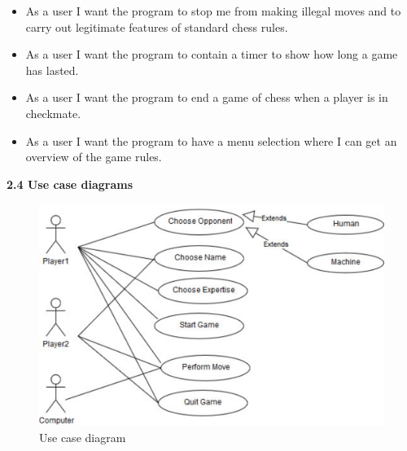 \documentclass{article}
\begin{document}
\begin{flushleft}
\begin{itemize}
	\item As a user I want the program to stop me from making illegal moves and to carry out legitimate features of standard chess rules.
	\item As a user I want the program to contain a timer to show how long a game has lasted.
	\item As a user I want the program to end a game of chess when a player is in checkmate.
	\item As a user I want the program to have a menu selection where I can get an overview of the game rules.
	\end{itemize}
\vspace{5mm}

\newpage

\textbf{2.4	Use case diagrams}\\

\end{flushleft}


\begin{figure}[h]
		\includegraphics*[scale=0.8]{User_case_diagram_1}
	\caption{Use case diagram }
	
\end{figure}
\end{document}
